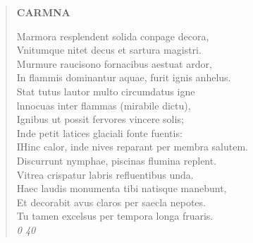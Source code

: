 \documentclass[11pt, a4paper]{report}
\begin{document}
\begin{verse}
    \begin{center} \textbf{CARMNA} \end{center} \marginpar{[290]} Marmora resplendent solida conpage decora, \\ Vnitumque nitet decus  \lbrack et \rbrack  sartura magistri. \\ Murmure raucisono fornacibus aestuat ardor, \\ In flammis dominantur aquae, furit ignis anhelus. \\ Stat tutus lautor multo circumdatus igne \\ lnnocuas inter flammas (mirabile dictu), \\ Ignibus ut possit fervores vincere solis; \\ Inde petit latices glaciali fonte fuentis: \\ IHinc calor, inde nives reparant per membra salutem. \\ Discurrunt nymphae, piscinas flumina replent. \\ Vitrea crispatur labris refluentibus unda. \\ Haec laudis monumenta tibi natisque manebunt, \\ Et decorabit avus claros per saecla nepotes. \\ Tu tamen excelsus per tempora longa fruaris. \\ \textit{0 40} \\ 
      \end{verse}
  
\end{document}
